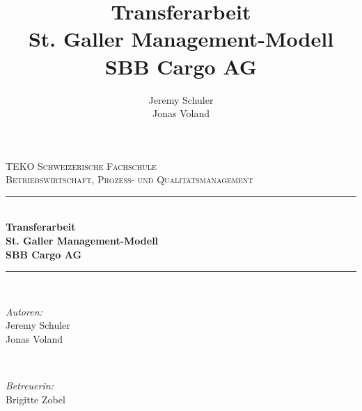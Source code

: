 \documentclass{article}
\title{
    Transferarbeit
    \\St. Galler Management-Modell
    \\SBB Cargo AG}
\author{
    Jeremy Schuler\\
    Jonas Voland
}
\begin{document}
\begin{titlepage}

    \newcommand{\HRule}{\rule{\linewidth}{0.5mm}} %
    
    \center %
     
    
    \textsc{\LARGE TEKO Schweizerische Fachschule}\\[1.5cm] %
    \textsc{\Large Betriebswirtschaft, Prozess- und Qualitätsmanagement}\\[0.5cm] %
    
    
    \HRule \\[0.4cm]
    { \huge \bfseries Transferarbeit
    \\St. Galler Management-Modell
    \\SBB Cargo AG}\\[0.4cm] %
    \HRule \\[1.5cm]
     
    
    \begin{minipage}{0.4\textwidth}
    \begin{flushleft} \large
    \emph{Autoren:}\\
    Jeremy Schuler\\
    Jonas Voland
    \end{flushleft}
    \end{minipage}
    ~
    \begin{minipage}{0.4\textwidth}
    \begin{flushright} \large
    \emph{Betreuerin:} \\
    Brigitte Zobel
    \end{flushright}
    \end{minipage}\\[2cm]
    

\end{titlepage}
\end{document}
